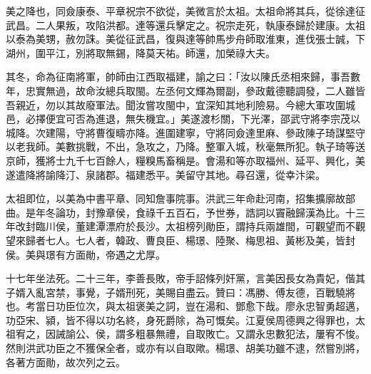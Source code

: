 \begin{pinyinscope}
美之降也，同僉康泰、平章祝宗不欲從，美微言於太祖。太祖命將其兵，從徐達征武昌。二人果叛，攻陷洪都。達等還兵擊定之。祝宗走死，執康泰歸於建康。太祖以泰為美甥，赦勿誅。美從征武昌，復與達等帥馬步舟師取淮東，進伐張士誠，下湖州，圍平江，別將取無錫，降莫天祐。師還，加榮祿大夫。

其冬，命為征南將軍，帥師由江西取福建，諭之曰：「汝以陳氏丞相來歸，事吾數年，忠實無過，故命汝總兵取閩。左丞何文輝為爾副，參政戴德聽調發，二人雖皆吾親近，勿以其故廢軍法。聞汝嘗攻閩中，宜深知其地利險易。今總大軍攻圍城邑，必擇便宜可否為進退，無失機宜。」美遂渡杉關，下光澤，邵武守將李宗茂以城降。次建陽，守將曹復疇亦降。進圍建寧，守將同僉達里麻、參政陳子琦謀堅守以老我師。美數挑戰，不出，急攻之，乃降。整軍入城，秋毫無所犯。執子琦等送京師，獲將士九千七百餘人，糧糗馬畜稱是。會湯和等亦取福州、延平、興化，美遂遣降將諭降汀、泉諸郡。福建悉平。美留守其地。尋召還，從幸汴梁。

太祖即位，以美為中書平章、同知詹事院事。洪武三年命赴河南，招集擴廓故部曲。是年冬論功，封豫章侯，食祿千五百石，予世券，誥詞以竇融歸漢為比。十三年改封臨川侯，董建潭漂府於長沙。太祖榜列勛臣，謂持兵兩雄間，可觀望而不觀望來歸者七人。七人者，韓政、曹良臣、楊璟、陸聚、梅思祖、黃彬及美，皆封侯。美與璟有方面勛，帝遇之尤厚。

十七年坐法死。二十三年，李善長敗，帝手詔條列奸黨，言美因長女為貴妃，偕其子婿入亂宮禁，事覺，子婿刑死，美賜自盡云。贊曰：馮勝、傅友德，百戰驍將也。考當日功臣位次，與太祖褒美之詞，豈在湯和、鄧愈下哉。廖永忠智勇超邁，功亞宋、潁，皆不得以功名終，身死爵除，為可慨矣。江夏侯周德興之得罪也，太祖宥之，因誡諭公、侯，謂多粗暴無禮，自取敗亡。又謂永忠數犯法，屢宥不悛。然則洪武功臣之不獲保全者，或亦有以自取歟。楊璟、胡美功雖不逮，然嘗別將，各著方面勛，故次列之云。


\end{pinyinscope}